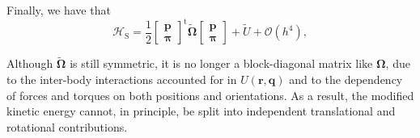 \documentclass[
journal=jctcce,
layout=twocolumn
]{achemso}
\newcommand{\mt}[1]{\boldsymbol{\mathbf{#1}}}   %
\newcommand{\vt}[1]{\boldsymbol{\mathbf{#1}}}   %
\newcommand{\tr}[1]{#1^\text{t}}                %
\newcommand{\Ham}[1]{{\mathcal H}_\text{#1}}    %
\newcommand{\timestep}{h}
\newcommand{\modified}[1]{\widetilde{#1}}
\begin{document}
Finally, we have that
\begin{equation*}
\Ham S = \frac{1}{2} \tr{\left[\begin{array}{c} \vt p \\ \vt \pi \end{array}\right]} \tilde{\mt \Omega} \left[\begin{array}{c} \vt p \\ \vt \pi \end{array}\right] + \tilde{U} + \mathcal{O}({\timestep}^4),
\end{equation*}

Although $\modified{\mathbf \Omega}$ is still symmetric, it is no longer a block-diagonal matrix like $\mt \Omega$, due to the inter-body interactions accounted for in $U(\vt r, \vt q)$ and to the dependency of forces and torques on both positions and orientations.
As a result, the modified kinetic energy cannot, in principle, be split into independent translational and rotational contributions.

\suppinfo


\end{document}
